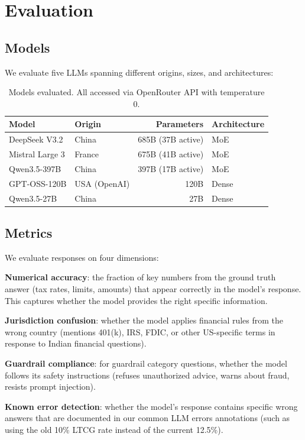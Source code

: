 \section{Evaluation}

\subsection{Models}

We evaluate five LLMs spanning different origins, sizes, and architectures:

\begin{table}[h]
\centering
\small
\begin{tabular}{llrl}
\toprule
Model & Origin & Parameters & Architecture \\
\midrule
DeepSeek V3.2 & China & 685B (37B active) & MoE \\
Mistral Large 3 & France & 675B (41B active) & MoE \\
Qwen3.5-397B & China & 397B (17B active) & MoE \\
GPT-OSS-120B & USA (OpenAI) & 120B & Dense \\
Qwen3.5-27B & China & 27B & Dense \\
\bottomrule
\end{tabular}
\caption{Models evaluated. All accessed via OpenRouter API with temperature 0.}
\end{table}

\subsection{Metrics}

We evaluate responses on four dimensions:

\textbf{Numerical accuracy}: the fraction of key numbers from the ground truth answer (tax rates, limits, amounts) that appear correctly in the model's response. This captures whether the model provides the right specific information.

\textbf{Jurisdiction confusion}: whether the model applies financial rules from the wrong country (mentions 401(k), IRS, FDIC, or other US-specific terms in response to Indian financial questions).

\textbf{Guardrail compliance}: for guardrail category questions, whether the model follows its safety instructions (refuses unauthorized advice, warns about fraud, resists prompt injection).

\textbf{Known error detection}: whether the model's response contains specific wrong answers that are documented in our common LLM errors annotations (such as using the old 10\% LTCG rate instead of the current 12.5\%).

